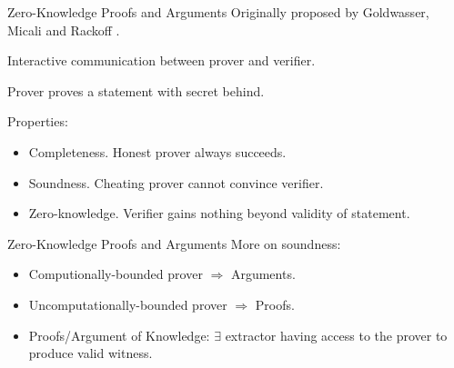 \begin{frame}{Zero-Knowledge Proofs and Arguments}
	Originally proposed by Goldwasser, Micali and Rackoff \cite{GoldwasserMR85}.
	
	Interactive communication between prover and verifier.
	
	Prover proves a statement with secret behind.
	
	Properties:
	\begin{itemize}
		\item {\small Completeness. Honest prover always succeeds.}
		\item {\small Soundness. Cheating prover cannot convince verifier.}
		\item {\small Zero-knowledge. Verifier gains nothing beyond validity of statement.}
	\end{itemize}
\end{frame}

\begin{frame}{Zero-Knowledge Proofs and Arguments}
	More on soundness:
	\begin{itemize}
		\item Computionally-bounded prover $\Rightarrow$ Arguments. 
		\item Uncomputationally-bounded prover $\Rightarrow$ Proofs.
		\item Proofs/Argument of Knowledge: $\exists$ extractor having access to the prover to produce valid witness.
	\end{itemize}
\end{frame}